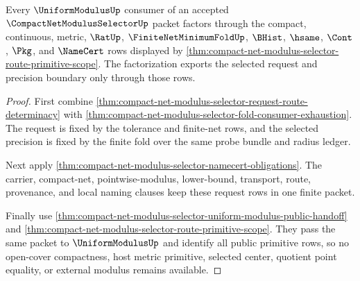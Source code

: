 \begin{theorem}
\label{thm:compact-net-modulus-selector-uniform-request-factorization}
Every $\UniformModulusUp$ consumer of an accepted
$\CompactNetModulusSelectorUp$ packet factors through the compact, continuous,
metric, $\RatUp$, $\FiniteNetMinimumFoldUp$, $\BHist$, $\hsame$, $\Cont$,
$\Pkg$, and $\NameCert$ rows displayed by
\autoref{thm:compact-net-modulus-selector-route-primitive-scope}. The
factorization exports the selected request and precision boundary only through
those rows.
\end{theorem}
\begin{proof}
First combine
\autoref{thm:compact-net-modulus-selector-request-route-determinacy} with
\autoref{thm:compact-net-modulus-selector-fold-consumer-exhaustion}. The
request is fixed by the tolerance and finite-net rows, and the selected
precision is fixed by the finite fold over the same probe bundle and radius
ledger.

Next apply \autoref{thm:compact-net-modulus-selector-namecert-obligations}. The
carrier, compact-net, pointwise-modulus, lower-bound, transport, route,
provenance, and local naming clauses keep these request rows in one finite
packet.

Finally use \autoref{thm:compact-net-modulus-selector-uniform-modulus-public-handoff}
and \autoref{thm:compact-net-modulus-selector-route-primitive-scope}. They pass
the same packet to $\UniformModulusUp$ and identify all public primitive rows,
so no open-cover compactness, host metric primitive, selected center, quotient
point equality, or external modulus remains available.
\end{proof}

